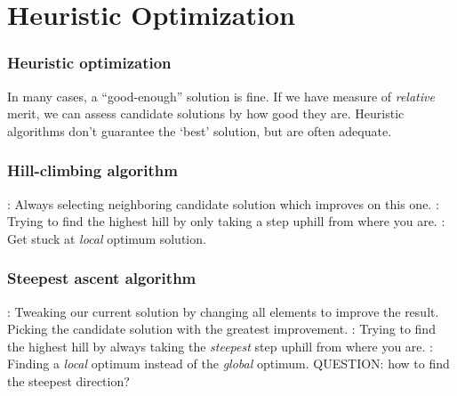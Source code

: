 \documentclass[11pt]{beamer}
\begin{document}
\section{Heuristic Optimization}

\begin{frame}[fragile]
  \frametitle{Heuristic optimization}
  \Enlarge

  \begin{enumerate}
  \myitem  In many cases, a ``good-enough'' solution is fine.  \pause
  \myitem  If we have measure of \emph{relative} merit, we can assess candidate solutions by how good they are.  \pause
  \myitem  Heuristic algorithms don't guarantee the `best' solution, but are often adequate. %
  \end{enumerate}
\end{frame}

\begin{frame}[fragile]
  \frametitle{Hill-climbing algorithm}
  \Enlarge

  \begin{enumerate}
  :  Always selecting neighboring candidate solution which improves on this one. \pause
  :  Trying to find the highest hill by only taking a step uphill from where you are. \pause
  :  Get stuck at \emph{local} optimum solution.
  \end{enumerate}
\end{frame}


\begin{frame}[fragile]
  \frametitle{Steepest ascent algorithm}
  \Enlarge

  \begin{enumerate}
  :  Tweaking our current solution by changing all elements to improve the result.  Picking the candidate solution with the greatest improvement. \pause
  :  Trying to find the highest hill by always taking the \emph{steepest} step uphill from where you are. \pause
  :  Finding a \emph{local} optimum instead of the \emph{global} optimum. QUESTION: how to find the steepest direction?
  \end{enumerate}
\end{frame}
\end{document}
